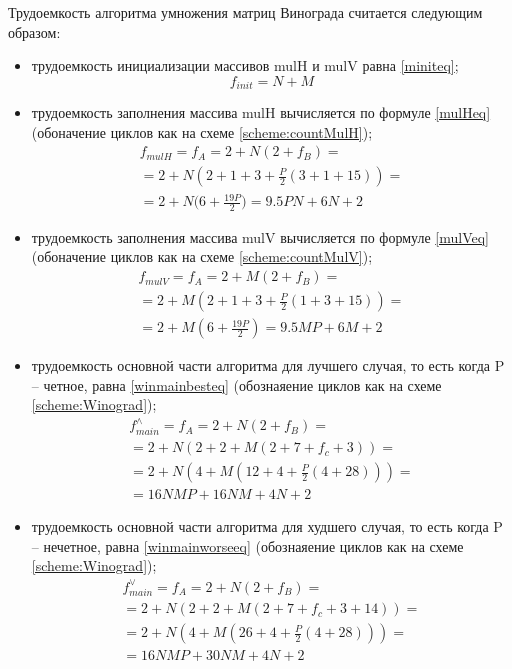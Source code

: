 Трудоемкость алгоритма умножения матриц Винограда считается следующим образом:
\begin{itemize}[left=\parindent]
    \item трудоемкость инициализации массивов mulH и mulV равна \ref{miniteq};
        \begin{equation}\label{miniteq}
            f_{init} = N + M
        \end{equation}

    \item трудоемкость заполнения массива mulH вычисляется по формуле
        \ref{mulHeq} (обоначение циклов как на схеме \ref{scheme:countMulH});
        \begin{multline}\label{mulHeq}
            f_{mulH} = f_A = 2 + N(2 + f_B) = \\ = 2 + N(2 +
                       1 + 3 + \frac{P}{2}(3 + 1 + 15)) = \\ = 2 +
                       N\big(6 + \frac{19P}{2}\big) = 9.5PN + 6N + 2
        \end{multline}

    \item трудоемкость заполнения массива mulV вычисляется по формуле
        \ref{mulVeq} (обоначение циклов как на схеме \ref{scheme:countMulV});
        \begin{multline}\label{mulVeq}
            f_{mulV} = f_A = 2 + M(2 + f_B) = \\ = 2 +
            M(2 + 1 + 3 + \frac{P}{2}(1 + 3 + 15)) = \\ = 2 + M(6 +
            \frac{19P}{2}) = 9.5MP + 6M + 2
        \end{multline}

    \item трудоемкость основной части алгоритма для лучшего случая, то есть
        когда P -- четное, равна \ref{winmainbesteq} (обознаяение циклов как на
        схеме \ref{scheme:Winograd});
        \begin{multline}\label{winmainbesteq}
            f_{main}^{\wedge} = f_A = 2 + N(2 + f_B) = \\ =  2 + N(2 + 2 + M(2
            + 7 + f_c + 3)) = \\ = 2 + N(4 + M(12 + 4 + \frac{P}{2}(4 + 28))) =
            \\ = 16NMP + 16NM + 4N + 2
        \end{multline}

    \item трудоемкость основной части алгоритма для худшего случая, то есть
        когда P -- нечетное, равна \ref{winmainworseeq} (обознаяение циклов как
        на схеме \ref{scheme:Winograd});
        \begin{multline}\label{winmainworseeq}
            f_{main}^{\vee} = f_A = 2 + N(2 + f_B) = \\ =  2 + N(2 + 2 + M(2 +
            7 + f_c + 3 + 14)) = \\ = 2 + N(4 + M(26 + 4 + \frac{P}{2}(4 +
            28))) = \\ = 16NMP + 30NM + 4N + 2
        \end{multline}
\end{itemize}

